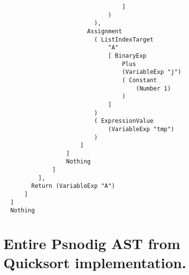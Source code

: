 \begin{lstlisting}
                                  ]
                              )
                          ),
                        Assignment
                          ( ListIndexTarget
                              "A"
                              [ BinaryExp
                                  Plus
                                  (VariableExp "j")
                                  ( Constant
                                      (Number 1)
                                  )
                              ]
                          )
                          ( ExpressionValue
                              (VariableExp "tmp")
                          )
                      ]
                  ]
                  Nothing
              ]
          ],
        Return (VariableExp "A")
      ]
  ]
  Nothing
\end{lstlisting}

\section{Entire Psnodig AST from Quicksort implementation.}
\label{appendix:Entire Psnodig AST from Quicksort implementation.}

